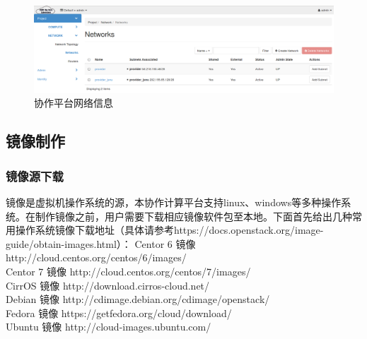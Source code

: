 \documentclass[12pt]{ctexart}%
\begin{document}
\begin{figure}[!htb]
\centering
\includegraphics[width=6in]{./figures/Project_Network_Networks}
\caption{协作平台网络信息}
\label{fig:projectnetworknetworks}
\end{figure}
\subsection{镜像制作}
\subsubsection{镜像源下载}
镜像是虚拟机操作系统的源，本协作计算平台支持linux、windows等多种操作系统。在制作镜像之前，用户需要下载相应镜像软件包至本地。下面首先给出几种常用操作系统镜像下载地址（具体请参考https://docs.openstack.org/image-guide/obtain-images.html）：
Centor 6 镜像 http://cloud.centos.org/centos/6/images/ \\
Centor 7 镜像 http://cloud.centos.org/centos/7/images/ \\
CirrOS 镜像 http://download.cirros-cloud.net/ \\
Debian 镜像 http://cdimage.debian.org/cdimage/openstack/ \\
Fedora 镜像 https://getfedora.org/cloud/download/ \\
Ubuntu 镜像 http://cloud-images.ubuntu.com/
\end{document}
